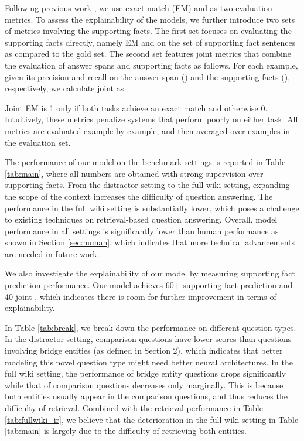 Following previous work \cite{rajpurkar2016squad}, we use exact match (EM) and \fone{} as two evaluation metrics.
To assess the explainability of the models, we further introduce two sets of metrics involving the supporting facts.
The first set focuses on evaluating the supporting facts directly, namely EM and \fone{} on the set of supporting fact sentences as compared to the gold set.
The second set features joint metrics that combine the evaluation of answer spans and supporting facts as follows.
For each example, given its precision and recall on the answer span () and the supporting facts (), respectively, we calculate joint \fone{} as

\vspace{-2em}

Joint EM is 1 only if both tasks achieve an exact match and otherwise 0.
Intuitively, these metrics penalize systems that perform poorly on either task.
All metrics are evaluated example-by-example, and then averaged over examples in the evaluation set.

The performance of our model on the benchmark settings is reported in Table \ref{tab:main}, where all numbers are obtained with strong supervision over supporting facts. From the distractor setting to the full wiki setting, expanding the scope of the context increases the difficulty of question answering.
The performance in the full wiki setting is substantially lower, which poses a challenge to existing techniques on retrieval-based question answering.
Overall, model performance in all settings is significantly lower than human performance as shown in Section \ref{sec:human}, which indicates that more technical advancements are needed in future work.

We also investigate the explainability of our model by measuring supporting fact prediction performance.
Our model achieves 60+ supporting fact prediction \fone{} and 40 joint \fone{}, which indicates there is room for further improvement in terms of explainability.



In Table \ref{tab:break}, we break down the performance on different question types.
In the distractor setting, comparison questions have lower \fone{} scores than questions involving bridge entities (as defined in Section 2), which indicates that better modeling this novel question type might need better neural architectures.
In the full wiki setting, the performance of bridge entity questions drops significantly while that of comparison questions decreases only marginally.
This is because both entities usually appear in the comparison questions, and thus reduces the difficulty of retrieval.
Combined with the retrieval performance in Table \ref{tab:fullwiki_ir}, we believe that the deterioration in the full wiki setting in Table \ref{tab:main} is largely due to the difficulty of retrieving both entities.

